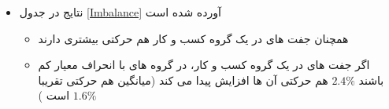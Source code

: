 \begin{itemize}
	\item 
	نتایج در جدول
	\ref{Imbalance}
	آورده شده است
	\begin{LTR}
	\end{LTR}
\begin{itemize}
	\item 
	همچنان جفت های در یک گروه کسب و کار هم حرکتی بیشتری دارند
	\item 
	اگر جفت های در یک گروه کسب و کار، در گروه های با انحراف معیار کم باشند $ 2.4\% $ هم حرکتی آن ها افزایش پیدا می کند
	(میانگین هم حرکتی تقریبا $ 1.6 \%$ است )

	
\end{itemize}
\end{itemize}

\FloatBarrier

